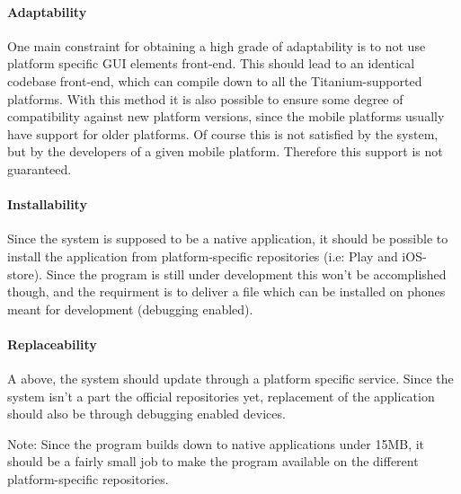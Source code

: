 \paragraph{Adaptability}
One main constraint for obtaining a high grade of adaptability is to not use platform specific GUI elements front-end. This should lead to an identical codebase front-end, which can compile down to all the Titanium-supported platforms. With this method it is also possible to ensure some degree of compatibility against new platform versions, since the mobile platforms usually have support for older platforms. Of course this is not satisfied by the system, but by the developers of a given mobile platform. Therefore this support is not guaranteed.  

\paragraph{Installability}
Since the system is supposed to be a native application, it should be possible to install the application from platform-specific repositories (i.e: Play and iOS-store). Since the program is still under development this won't be accomplished though, and the requirment is to deliver a file which can be installed on phones meant for development (debugging enabled).

\paragraph{Replaceability}
A above, the system should update through a platform specific service. Since the system isn't a part the official repositories yet, replacement of the application should also be through debugging enabled devices. 

Note: Since the program builds down to native applications under 15MB, it should be a fairly small job to make the program available on the different platform-specific repositories.  



